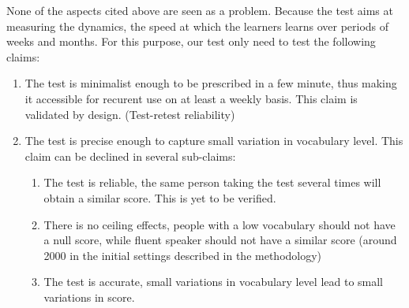 None of the aspects cited above are seen as a problem. Because the test aims at measuring the dynamics, the speed at which the learners learns over periods of weeks and months. For this purpose, our test only need to test the following claims:
\begin{enumerate}
  \item The test is minimalist enough to be prescribed in a few minute, thus making it accessible for recurent use on at least a weekly basis. This claim is validated by design. (Test-retest reliability)
  \item The test is precise enough to capture small variation in vocabulary level. This claim can be declined in several sub-claims:
  \begin{enumerate}
    \item The test is reliable, the same person taking the test several times will obtain a similar score. This is yet to be verified.
    \item There is no ceiling effects, people with a low vocabulary should not have a null score, while fluent speaker should not have a similar score (around 2000 in the initial settings described in the methodology)
    \item The test is accurate, small variations in vocabulary level lead to small variations in score.
  \end{enumerate}
\end{enumerate}